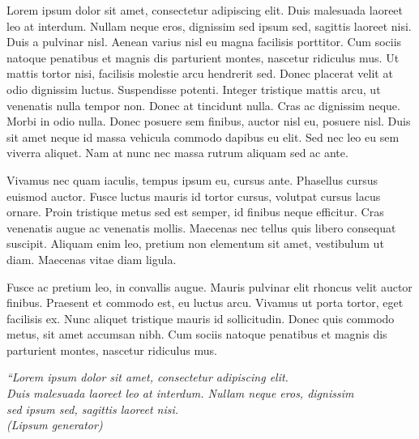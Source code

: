 \documentclass[
	12pt,				%
	openright,			%
	twoside,			%
	a4paper,			%
	english,			%
	french,				%
	spanish,			%
	brazil				%
	]{abntex2}
\begin{document}
\begin{agradecimentos}
Lorem ipsum dolor sit amet, consectetur adipiscing elit. Duis malesuada laoreet leo at interdum. Nullam neque eros, dignissim sed ipsum sed, sagittis laoreet nisi. Duis a pulvinar nisl. Aenean varius nisl eu magna facilisis porttitor. Cum sociis natoque penatibus et magnis dis parturient montes, nascetur ridiculus mus. Ut mattis tortor nisi, facilisis molestie arcu hendrerit sed. Donec placerat velit at odio dignissim luctus. Suspendisse potenti. Integer tristique mattis arcu, ut venenatis nulla tempor non. Donec at tincidunt nulla. Cras ac dignissim neque. Morbi in odio nulla. Donec posuere sem finibus, auctor nisl eu, posuere nisl. Duis sit amet neque id massa vehicula commodo dapibus eu elit. Sed nec leo eu sem viverra aliquet. Nam at nunc nec massa rutrum aliquam sed ac ante.

Vivamus nec quam iaculis, tempus ipsum eu, cursus ante. Phasellus cursus euismod auctor. Fusce luctus mauris id tortor cursus, volutpat cursus lacus ornare. Proin tristique metus sed est semper, id finibus neque efficitur. Cras venenatis augue ac venenatis mollis. Maecenas nec tellus quis libero consequat suscipit. Aliquam enim leo, pretium non elementum sit amet, vestibulum ut diam. Maecenas vitae diam ligula.

Fusce ac pretium leo, in convallis augue. Mauris pulvinar elit rhoncus velit auctor finibus. Praesent et commodo est, eu luctus arcu. Vivamus ut porta tortor, eget facilisis ex. Nunc aliquet tristique mauris id sollicitudin. Donec quis commodo metus, sit amet accumsan nibh. Cum sociis natoque penatibus et magnis dis parturient montes, nascetur ridiculus mus.
\end{agradecimentos}


\begin{epigrafe}
    \vspace*{\fill}
	\begin{flushright}
		\textit{``Lorem ipsum dolor sit amet, consectetur adipiscing elit. \\
		Duis malesuada laoreet leo at interdum. Nullam neque eros, dignissim \\
		sed ipsum sed, sagittis laoreet nisi.\\
		(Lipsum generator)}
	\end{flushright}
\end{epigrafe}
\end{document}
